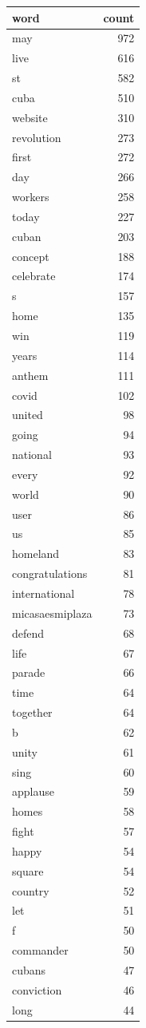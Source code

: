 \begin{tabular}{lr}
\toprule
word & count \\
\midrule
may & 972 \\
live & 616 \\
st & 582 \\
cuba & 510 \\
website & 310 \\
revolution & 273 \\
first & 272 \\
day & 266 \\
workers & 258 \\
today & 227 \\
cuban & 203 \\
concept & 188 \\
celebrate & 174 \\
s & 157 \\
home & 135 \\
win & 119 \\
years & 114 \\
anthem & 111 \\
covid & 102 \\
united & 98 \\
going & 94 \\
national & 93 \\
every & 92 \\
world & 90 \\
user & 86 \\
us & 85 \\
homeland & 83 \\
congratulations & 81 \\
international & 78 \\
micasaesmiplaza & 73 \\
defend & 68 \\
life & 67 \\
parade & 66 \\
time & 64 \\
together & 64 \\
b & 62 \\
unity & 61 \\
sing & 60 \\
applause & 59 \\
homes & 58 \\
fight & 57 \\
happy & 54 \\
square & 54 \\
country & 52 \\
let & 51 \\
f & 50 \\
commander & 50 \\
cubans & 47 \\
conviction & 46 \\
long & 44 \\
\bottomrule
\end{tabular}
